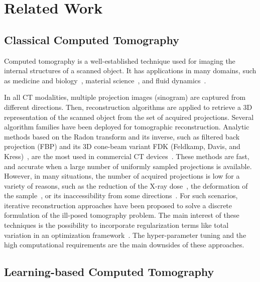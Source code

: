 \documentclass[acmtog,nonacm]{acmart} \acmSubmissionID{0438}
\begin{document}
\section{Related Work}

\subsection{Classical Computed Tomography}

Computed tomography is a well-established technique used for imaging the internal structures of a scanned object. It has applications in many domains, such as medicine and biology~\cite{van2001computer, kiljunen2015dental, rawson2020x, piovesan2021x}, material science~\cite{brisard2020multiscale, vasarhelyi2020microcomputed}, and fluid dynamics~\cite{hasinoff2007photo, atcheson2008time, gregson2012stochastic, eckert2019scalarflow, zang2020tomofluid}.

In all CT modalities, multiple projection images (sinogram) are captured from different directions. Then, reconstruction algorithms are applied to retrieve a 3D representation of the scanned object from the set of acquired projections. Several algorithm families have been deployed for tomographic reconstruction. Analytic methods based on the Radon transform and its inverse, such as filtered back projection (FBP) and its 3D cone-beam variant FDK (Feldkamp, Davis, and Kress)~\cite{feldkamp1984practical}, are the most used in commercial CT devices~\cite{pan2009commercial}. These methods are fast, and accurate when a large number of uniformly sampled projections is available. However, in many situations, the number of acquired projections is low for a variety of reasons, such as the reduction of the X-ray dose~\cite{gao2014low}, the deformation of the sample~\cite{zang2018space, zang2019warp}, or its inaccessibility from some directions~\cite{du2021study}. For such scenarios, iterative reconstruction approaches have been proposed to solve a discrete formulation of the ill-posed tomography problem. The main interest of these techniques is the possibility to incorporate regularization terms like total variation in an optimization framework~\cite{sidky2008image, huang2013iterative, kisner2012model, huang2018scale, zang2018super, xu2020limited, abujbara2021non}. The hyper-parameter tuning and the high computational requirements are the main downsides of these approaches.

\subsection{Learning-based Computed Tomography}
\end{document}
